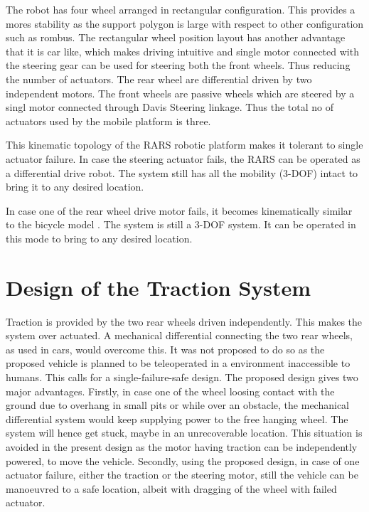  The robot has four wheel arranged in rectangular configuration. This provides a mores stability as the support polygon is large with respect to other configuration such as rombus. The rectangular wheel position layout has another advantage that it is car like, which makes driving intuitive and single motor connected with the steering gear can be used for steering both the front wheels. Thus reducing the number of actuators.
  The rear wheel are differential driven by two independent motors.  The front wheels are passive wheels which are steered by a singl motor connected through Davis Steering linkage. Thus the total no of actuators used by the mobile platform is three.
 
 This kinematic topology of the RARS robotic platform makes it tolerant to single actuator failure. In case the steering actuator fails, the RARS can be operated as a differential drive robot. The system still has all the mobility (3-DOF) intact to bring it to any desired location.
 
 In case one of the rear wheel drive motor fails, it becomes kinematically similar to the bicycle model \cite{campion1996structural}. The system is still a 3-DOF system. It can be operated in this mode to bring to any desired location.
     

\section{Design of the Traction System}
Traction is provided by the two rear wheels driven independently. This makes the system over actuated. A mechanical differential connecting the two rear wheels, as used in cars,  would overcome this. It was not proposed to do so as the proposed vehicle is planned to be teleoperated in a environment inaccessible to humans. This calls for a single-failure-safe design. The proposed design gives two major advantages. 
Firstly, in case  one of the wheel loosing contact with the ground due to  overhang in small pits or while over an obstacle, the mechanical differential system would keep supplying power to the free hanging wheel. The system will hence get stuck, maybe in an unrecoverable location. This situation is avoided in the present design as the motor having traction can be independently powered, to move the vehicle.  
Secondly, using the proposed design, in case of one  actuator failure, either the traction or the steering motor, still the vehicle can be manoeuvred to a  safe location, albeit with dragging of the wheel with failed actuator.


